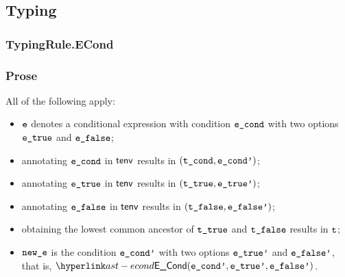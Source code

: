 \begin{mathpar}
\end{mathpar}

\subsection{Typing}
\subsubsection{TypingRule.ECond \label{sec:TypingRule.ECond}}
\subsubsection{Prose}
All of the following apply:
\begin{itemize}
  \item $\ve$ denotes a conditional expression with condition $\econd$ with two options $\etrue$ and $\efalse$;
  \item annotating $\econd$ in $\tenv$ results in $(\tcond, \econdp)$\ProseOrTypeError;
  \item annotating $\etrue$ in $\tenv$ results in $(\ttrue, \etruep)$\ProseOrTypeError;
  \item annotating $\efalse$ in $\tenv$ results in $(\tfalse, \efalsep)$;
  \item obtaining the lowest common ancestor of $\ttrue$ and $\tfalse$ results in $\vt$\ProseOrTypeError;
  \item $\newe$ is the condition $\econdp$ with two options $\etruep$ and $\efalsep$, that is, $\ECond(\econdp, \etruep, \efalsep)$.
\end{itemize}
